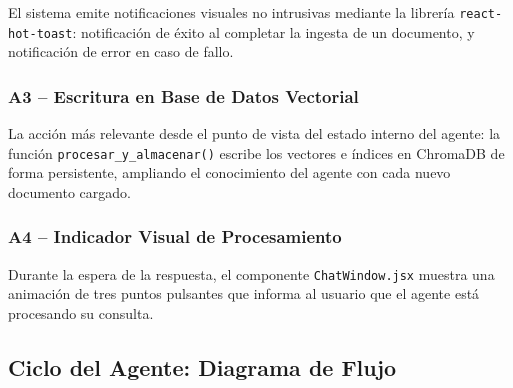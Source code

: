 \documentclass[12pt,a4paper]{article}
\begin{document}
El sistema emite notificaciones visuales no intrusivas mediante la librería \texttt{react-hot-toast}: notificación de éxito al completar la ingesta de un documento, y notificación de error en caso de fallo.

\subsubsection{A3 -- Escritura en Base de Datos Vectorial}

La acción más relevante desde el punto de vista del estado interno del agente: la función \texttt{procesar\_y\_almacenar()} escribe los vectores e índices en ChromaDB de forma persistente, ampliando el conocimiento del agente con cada nuevo documento cargado.

\subsubsection{A4 -- Indicador Visual de Procesamiento}

Durante la espera de la respuesta, el componente \texttt{ChatWindow.jsx} muestra una animación de tres puntos pulsantes que informa al usuario que el agente está procesando su consulta.

\subsection{Ciclo del Agente: Diagrama de Flujo}
\end{document}
